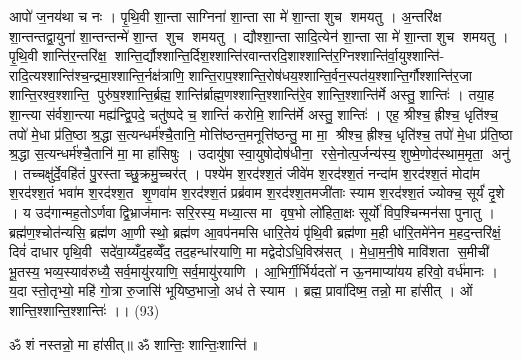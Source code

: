आपो॑ ज॒नय॑था च नः । पृ॒थि॒वी शा॒न्ता साग्निना॑ शा॒न्ता सा मे॑ शा॒न्ता शुच॑ शमयतु । अ॒न्तरि॑क्ष शा॒न्तन्तद्वा॒युना॑ शा॒न्तन्तन्मे॑ शा॒न्त शुच॑ शमयतु । द्यौश्शा॒न्ता सादि॒त्येन॑ शा॒न्ता सा मे॑ शा॒न्ता शुच॑ शमयतु । पृ॒थि॒वी शान्ति॑र॒न्तरि॑क्ष॒॒ शान्ति॒र्द्यौश्शान्ति॒र्दिश॒श्शान्ति॑रवान्तरदि॒शाश्शान्ति॑र॒ग्निश्शान्ति॑र्वा॒युश्शान्ति॑- रादि॒त्यश्शान्ति॑श्च॒न्द्रमा॒श्शान्ति॒र्नक्ष॑त्राणि॒ शान्ति॒राप॒श्शान्ति॒रोष॑धय॒श्शान्ति॒र्वन॒स्पत॑य॒श्शान्ति॒र्गौश्शान्ति॑र॒जा शान्ति॒रश्व॒श्शान्ति॒ पुरु॑ष॒श्शान्ति॒र्ब्रह्म॒ शान्ति॑र्ब्राह्म॒णश्शान्ति॒श्शान्ति॑रे॒व शान्ति॒श्शान्ति॑र्मे अस्तु॒ शान्तिः॑ । तया॒ह शा॒न्त्या स॑र्वशा॒न्त्या मह्य॑न्द्वि॒पदे॒ चतु॑ष्पदे च॒ शान्तिं॑ करोमि॒ शान्ति॑र्मे अस्तु॒ शान्तिः॑ । एह॒ श्रीश्च॒ ह्रीश्च॒ धृति॑श्च॒ तपो॑ मे॒धा प्र॑ति॒ष्ठा श्र॒द्धा स॒त्यन्धर्म॑श्चै॒तानि॒ मोत्ति॑ष्ठन्त॒मनूत्ति॑ष्ठन्तु॒ मा मा॒॒ श्रीश्च॒ ह्रीश्च॒ धृति॑श्च॒ तपो॑ मे॒धा प्र॑ति॒ष्ठा श्र॒द्धा स॒त्यन्धर्म॑श्चै॒तानि॑ मा॒ मा हा॑सिषुः । उदायु॑षा स्वा॒युषोदोष॑धीना॒॒ रसे॒नोत्प॒र्जन्य॑स्य॒ शुष्मे॒णोद॑स्थाम॒मृता॒॒ अनु॑ । तच्चक्षु॑र्दे॒वहि॑तं पु॒रस्ताच्छु॒क्रमु॒च्चर॑त् । पश्ये॑म श॒रद॑श्श॒तं जीवे॑म श॒रद॑श्श॒तं नन्दा॑म श॒रद॑श्श॒तं मोदा॑म श॒रद॑श्श॒तं भवा॑म श॒रद॑श्श॒त शृ॒णवा॑म श॒रद॑श्श॒तं प्रब्र॑वाम श॒रद॑श्श॒तमजी॑ताः स्याम श॒रद॑श्श॒तं ज्योक्च॒ सूर्यं॑ दृ॒शे । य उद॑गान्मह॒तोऽर्णवाद्वि॒भ्राज॑मानः सरि॒रस्य॒ मध्या॒त्स मा वृष॒भो लो॑हिता॒क्षः सूर्यो॑ विप॒श्चिन्मन॑सा पुनातु । ब्रह्म॑ण॒श्चोत॑न्यसि॒ ब्रह्म॑ण आ॒णी स्थो॒ ब्रह्म॑ण आ॒वप॑नमसि धारि॒तेयं पृ॑थि॒वी ब्रह्म॑णा म॒ही धा॑रि॒तमे॑नेन म॒हद॒न्तरि॑क्षं॒ दिवं॑ दाधार पृथि॒वी सदे॑वा॒य्यँद॒हव्वेँद॒ तद॒हन्धा॑रयाणि॒ मा मद्वेदोऽधि॒विस्र॑सत् । मे॒धा॒म॒नी॒षे मावि॑शता स॒मीची॑ भू॒तस्य॒ भव्य॒स्याव॑रुध्यै॒ सर्व॒मायु॑रयाणि॒ सर्व॒मायु॑रयाणि । आ॒भिर्गी॒र्भिर्यदतो॑ न ऊ॒नमाप्या॑यय हरिवो॒ वर्ध॑मानः । य॒दा स्तो॒तृभ्यो॒ महि॑ गो॒त्रा रु॒जासि॑ भूयिष्ठ॒भाजो॒ अध॑ ते स्याम । ब्रह्म॒ प्रावा॑दिष्म॒ तन्नो॒ मा हा॑सीत् । ओं शान्ति॒श्शान्ति॒श्शान्तिः॑ ।। (93)

\setcounter{anuvakam}{0}

ॐ शं नस्तन्नो॒ मा हा॑सीत्॥ ॐ शान्तिः॒ शान्तिः॒शान्ति॑॥

